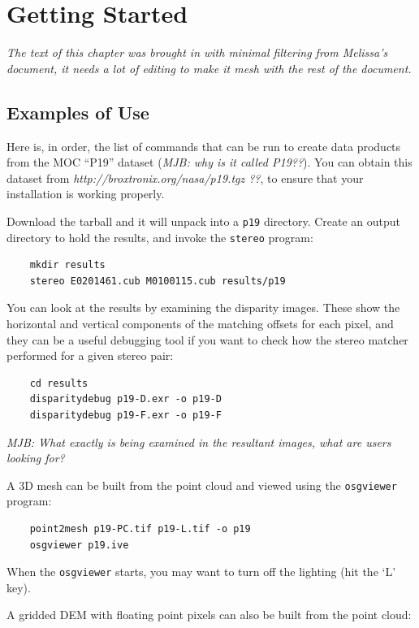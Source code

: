 \chapter{Getting Started}

\emph{The text of this chapter was brought in with minimal filtering from Melissa's document, it needs a lot of editing to make it mesh with the rest of the document.}

\section{Examples of Use}

Here is, in order, the list of commands that can be run to create
data products from the MOC ``P19'' dataset (\emph{MJB: why is it
called P19??}).  You can obtain this dataset from
\emph{http://broxtronix.org/nasa/p19.tgz ??}, to ensure that your
installation is working properly.

Download the tarball and it will unpack into a \texttt{p19} directory.  Create an output directory to hold the results, and invoke the \texttt{stereo} program:

\begin{verbatim}
	mkdir results
	stereo E0201461.cub M0100115.cub results/p19
\end{verbatim}

You can look at the results by examining the disparity images. These
show the horizontal and vertical components of the matching offsets
for each pixel, and they can be a useful debugging tool if you want
to check how the stereo matcher performed for a given stereo pair:

\begin{verbatim}
	cd results
	disparitydebug p19-D.exr -o p19-D     
	disparitydebug p19-F.exr -o p19-F
\end{verbatim}

\emph{MJB: What exactly is being examined in the resultant images, what are users looking for?}

A 3D mesh can be built from the point cloud and viewed using the
\texttt{osgviewer} program:

\begin{verbatim}
	point2mesh p19-PC.tif p19-L.tif -o p19
	osgviewer p19.ive
\end{verbatim}

When the \texttt{osgviewer} starts, you may want to turn off the
lighting (hit the `L' key).

A gridded DEM with floating point pixels can also be built from the point cloud:

